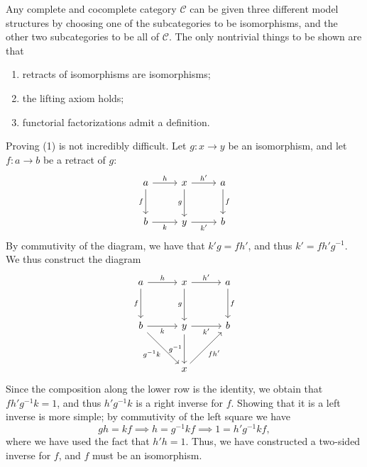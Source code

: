\begin{example}\label{1.1.9}
	Any complete and cocomplete category $\mathcal{C} $ can be given three different model structures by choosing one of the subcategories to be isomorphisms, and the other two subcategories to be all of $\mathcal{C} $. The only nontrivial things to be shown are that
	\begin{enumerate}
		\item retracts of isomorphisms are isomorphisms;
		\item the lifting axiom holds;
		\item functorial factorizations admit a definition.
	\end{enumerate}
	Proving (1) is not incredibly difficult. Let $g : x \to y$ be an isomorphism, and let $f : a \to b$ be a retract of $g$:
	\[\begin{tikzcd}[row sep = 2.5em, column sep = 2.5em]
	a \ar[" h ", r] \ar[" f "', d]  & x \ar[" h' ", r] \ar[" g "', d]  & a \ar[" f ", d]  \\
	b \ar[" k "', r]  & y \ar[" k' "', r]  & b
	\end{tikzcd}\]
	By commutivity of the diagram, we have that $k'g=fh'$, and thus $k'=fh'g^{-1} $. We thus construct the diagram
	\[\begin{tikzcd}[row sep = 3em, column sep = 3em]
	a \ar[" h ", r] \ar[" f "', d]  & x \ar[" h' ", r] \ar[" g "', d]  & a \ar[" f ", d]  \\
	b \ar[" k "', r] \ar[" g^{-1} k "', dr] & y \ar[" k' "', r] \ar[" g^{-1}  "', d]  & b\\
	& x \ar[" fh' "', ur] 
	\end{tikzcd}\]
	Since the composition along the lower row is the identity, we obtain that $fh'g^{-1} k=1$, and thus $h'g^{-1} k$ is a right inverse for $f$. Showing that it is a left inverse is more simple; by commutivity of the left square we have
	\[
		gh=kf \implies h=g^{-1} kf \implies 1=h'g^{-1} kf,
	\]
	where we have used the fact that $h'h=1$. Thus, we have constructed a two-sided inverse for $f$, and $f$ must be an isomorphism.


\end{example}
